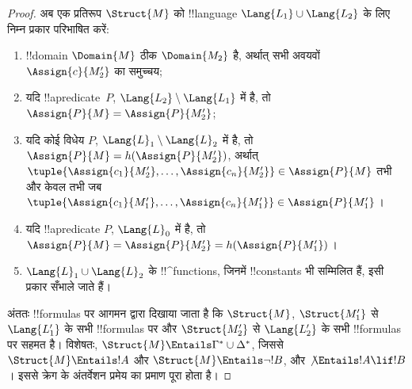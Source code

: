 \documentclass[../../../include/open-logic-section]{subfiles}
\begin{document}
\begin{proof}
अब एक प्रतिरूप $\Struct{M}$ को !!{language}
$\Lang{L_1} \cup \Lang{L_2}$ के लिए निम्न प्रकार परिभाषित करें:
\begin{enumerate}
\item !!{domain} $\Domain{M}$ ठीक $\Domain{M_2}$ है, अर्थात् सभी अवयवों
  $\Assign{c}{M'_2}$ का समुच्चय;
\item यदि !!a{predicate}~$P$, $\Lang{L_2} \setminus
  \Lang{L_1}$ में
  है, तो $\Assign{P}{M} = \Assign{P}{M'_2}$;
\item यदि कोई विधेय $P$, $\Lang{L}_1\setminus \Lang{L}_2$ में है, तो
  $\Assign{P}{M} = h(\Assign{P}{M'_2})$, अर्थात्
  $\tuple{\Assign{c_1}{M'_2}, \dots, \Assign{c_n}{M'_2}} \in
  \Assign{P}{M}$ तभी और केवल तभी जब
  $\tuple{\Assign{c_1}{M'_1}, \dots,
  \Assign{c_n}{M'_1}} \in \Assign{P}{M'_1}$।
\item यदि !!a{predicate} $P$, $\Lang{L}_0$ में है, तो
  $\Assign{P}{M} =
  \Assign{P}{M'_2} = h(\Assign{P}{M'_1})$।
\item $\Lang{L}_1 \cup \Lang{L}_2$ के !!^{function}s, जिनमें
  !!{constant}s भी सम्मिलित हैं, इसी प्रकार सँभाले जाते हैं।
\end{enumerate}

अंततः !!{formula}s पर आगमन द्वारा दिखाया जाता है कि $\Struct{M}$,
$\Struct{M'_1}$ से $\Lang{L'_1}$ के सभी !!{formula}s पर और
$\Struct{M'_2}$ से $\Lang{L'_2}$ के सभी !!{formula}s पर सहमत है।
विशेषतः, $\Struct{M} \Entails \Gamma^* \cup \Delta^*$, जिससे
$\Struct{M}
\Entails !A$ और $\Struct{M} \Entails \lnot!B$, और
$\not\Entails !A \lif !B$। इससे क्रेग के अंतर्वेशन प्रमेय का प्रमाण
पूरा होता है।
\end{proof}
\end{document}
